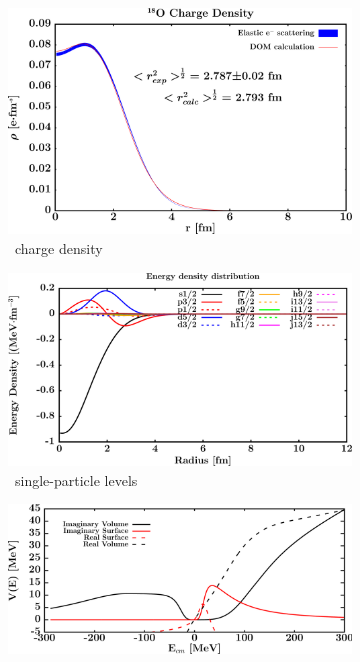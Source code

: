 \begin{figure}[hbtp]
    \captionsetup[subfigure]{labelformat=empty}
    \centering
    \begin{subfigure}[b]{0.45\textwidth}
        \centering
        \includegraphics[width=\linewidth]{figures/o18_chargeDensity.png}
        \caption{\oEight\ charge density}
        \label{DOMFitData_o18_chargeDensity}
    \end{subfigure}\hspace{6pt}
    \begin{subfigure}[b]{0.45\textwidth}
        \centering
        \includegraphics[width=\linewidth]{figures/o18_SPLevels.png}
        \caption{\oEight\ single-particle levels}
        \label{DOMFitData_o18_SPLevels}
    \end{subfigure}\vspace{0.3in}
    \begin{subfigure}[b]{0.45\textwidth}
        \centering
        \includegraphics[width=\linewidth]{figures/o18_protonPotentials.png}

\end{subfigure}
\end{figure}
